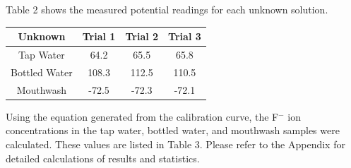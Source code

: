 \documentclass{article}
\begin{document}
Table 2 shows the measured potential readings for each unknown solution.
\begin{center}
    \begin{tabular}{|c|c|c|c|}
        \hline
        Unknown & Trial 1 & Trial 2 & Trial 3 \\
        \hline
        Tap Water & 64.2 & 65.5 & 65.8 \\
        Bottled Water & 108.3 & 112.5 & 110.5 \\
        Mouthwash & -72.5 & -72.3 & -72.1 \\
        \hline
    \end{tabular}
\end{center}

Using the equation generated from the calibration curve, the F$^-$ ion
concentrations in the tap water, bottled water, and mouthwash samples were
calculated. These values are listed in Table 3. Please refer to the Appendix for
detailed calculations of results and statistics.
\end{document}
